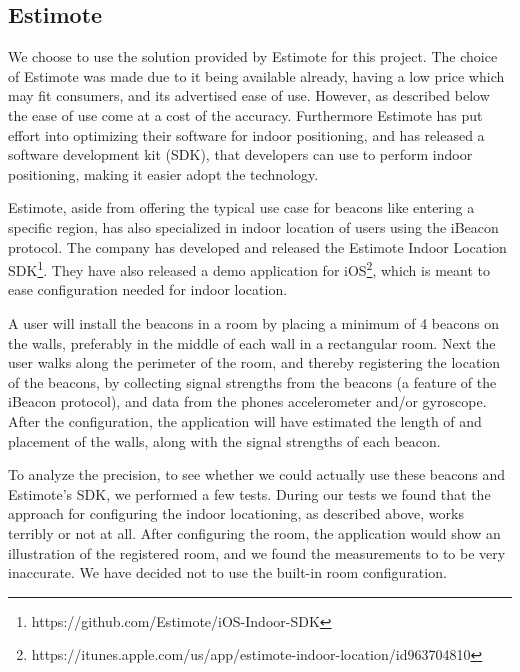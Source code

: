 \subsection{Estimote}
We choose to use the solution provided by Estimote for this project.
The choice of Estimote was made due to it being available already, 
having a low price which may fit consumers, 
and its advertised ease of use. 
However, as described below the ease of use come at a cost of the accuracy.
Furthermore Estimote has put effort into optimizing their software for indoor positioning, 
and has released a software development kit (SDK),
that developers can use to perform indoor positioning, 
making it easier adopt the technology.

Estimote, aside from offering the typical use case for beacons like entering a specific region, 
has also specialized in indoor location of users using the iBeacon protocol. 
The company has developed and released the Estimote Indoor Location SDK\footnote{https://github.com/Estimote/iOS-Indoor-SDK}.
They have also released a demo application for iOS\footnote{https://itunes.apple.com/us/app/estimote-indoor-location/id963704810}, 
which is meant to ease configuration needed for indoor location. 

A user will install the beacons in a room by placing a minimum of \num{4} beacons on the walls, 
preferably in the middle of each wall in a rectangular room.   
Next the user walks along the perimeter of the room, 
and thereby registering the location of the beacons, 
by collecting signal strengths from the beacons (a feature of the iBeacon protocol), 
and data from the phones accelerometer and/or gyroscope.
After the configuration, the application will have estimated the length of and placement of the walls, 
along with the signal strengths of each beacon.

To analyze the precision, 
to see whether we could actually use these beacons and Estimote's SDK, 
we performed a few tests. 
During our tests we found that the approach for configuring the indoor locationing, 
as described above, works terribly or not at all. 
After configuring the room, 
the application would show an illustration of the registered room, 
and we found the measurements to to be very inaccurate.
We have decided not to use the built-in room configuration. 

